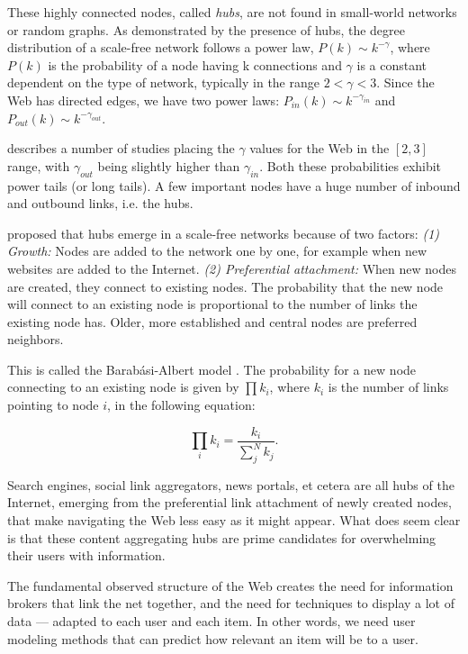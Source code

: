 These highly connected nodes, called \emph{hubs}, are not found in small-world networks or random graphs. As demonstrated by the presence of hubs, the degree distribution of a scale-free network follows a power law, 
$P(k) \sim k^{-\gamma}$, 
where $P(k)$ is the probability of a node having k connections and $\gamma$ is a constant dependent on the type of network, typically in the range $2 < \gamma < 3$. 
Since the Web has directed edges,
we have two power laws:
$P_{in}(k) \sim k^{-\gamma_{in}}$ and 
$P_{out}(k) \sim k^{-\gamma_{out}}$.

\cite{Albert1999} describes a number of studies placing the $\gamma$ values for the Web in the $[2,3]$ range, 
with $\gamma_{out}$ being slightly higher than $\gamma_{in}$. 
Both these probabilities exhibit power tails (or long tails). 
A few important nodes have a huge number of inbound and outbound links, i.e. the hubs. 

\citet[p86]{Barabasi2003} proposed that hubs emerge in a scale-free networks because of two factors:
\emph{(1) Growth:} Nodes are added to the network one by one, for example when new websites are added to the Internet.
\emph{(2) Preferential attachment:} When new nodes are created, they connect to existing nodes. The probability that the new node will connect to an existing node is proportional to the number of links the existing node has. Older, more established and central nodes are preferred neighbors.

This is called the Barab\'{a}si-Albert model \citep{Albert1999}. 
The probability for a new node connecting to an existing node is given by $\prod k_i$, 
where $k_i$ is the number of links pointing to node $i$, in the following equation: 

\begin{equation*}
  \prod_{i} k_i  = \frac{k_i}{\sum_{j}^N k_j}.
\end{equation*} 

Search engines, social link aggregators, news portals, et cetera are all hubs of the Internet, emerging from the preferential 
link attachment of newly created nodes, that make navigating the Web less easy as it might appear.
What does seem clear is that these content aggregating hubs are prime candidates for overwhelming their users with information. 

The fundamental observed structure of the Web creates the need for information brokers that link the net together, 
and the need for techniques to display a lot of data --- adapted to each user and each item.
In other words, we need user modeling methods that can predict how relevant an item will be to a user.


 


